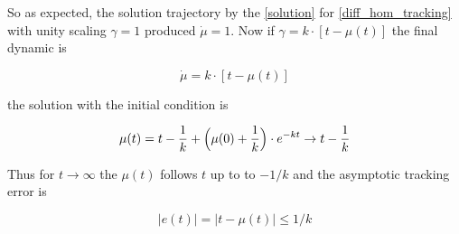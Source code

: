 \documentclass[11pt,american]{article}
\theoremstyle{definition}
\theoremstyle{plain}
\theoremstyle{remark}
\begin{document}
So as expected, the solution trajectory by the \eqref{solution} for \eqref{diff_hom_tracking} with unity scaling $\gamma = 1$ produced $\dot \mu = 1$.
Now if $\gamma = k \cdot [t - \mu(t)]$ the final dynamic is

\begin{equation}
\dot \mu = k \cdot [t - \mu(t)]
\end{equation}

the solution with the initial condition is

\begin{equation}
\mu(t) = t - \frac{1}{k} + \Bigl(\mu(0)+\frac{1}{k}\Bigr) \cdot e^{-kt} \to t - \frac{1}{k}
\end{equation}

Thus for $t \to \infty$ the $\mu(t)$ follows $t$ up to to $-1/k$ and the asymptotic tracking error is

\begin{equation}
|e(t)| = |t - \mu(t)| \le 1/k
\end{equation}
\end{document}

